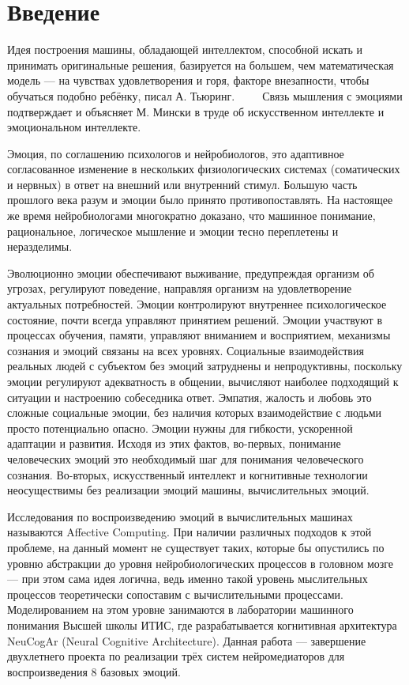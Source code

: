 \cleardoublepage
{}
{}
\chapter*{Введение}
\label{chap:introduction}
Идея построения машины, обладающей интеллектом, способной искать и принимать оригинальные решения, базируется на большем, чем математическая модель — на чувствах удовлетворения и горя, факторе внезапности, чтобы обучаться подобно ребёнку, писал А. Тьюринг.~\cite{small} ~\autocite{big} ~\autocite{intelligent_machinery} Связь мышления с эмоциями подтверждает и объясняет М. Мински в труде об искусственном интеллекте и эмоциональном интеллекте.~\cite{minsky2007}


Эмоция, по соглашению психологов и нейробиологов, это адаптивное согласованное изменение в нескольких физиологических системах (соматических и нервных) в ответ на внешний или внутренний стимул.\cite{plutchik2001} Большую часть прошлого века разум и эмоции было принято противопоставлять. На настоящее же время нейробиологами многократно доказано, что машинное понимание, рациональное, логическое мышление и эмоции тесно переплетены и неразделимы.\cite{Brosch, ziemke-role, damasio2004, damasio2008}


Эволюционно эмоции обеспечивают выживание, предупреждая  организм об угрозах, регулируют поведение, направляя организм на удовлетворение актуальных потребностей.\cite{whoneedsemotions} Эмоции контролируют внутреннее психологическое состояние, почти всегда управляют принятием решений.\cite{roleofemotions} Эмоции участвуют в процессах обучения, памяти, управляют вниманием и восприятием, механизмы сознания и эмоций связаны на всех уровнях.\cite{Phelps2006} Социальные взаимодействия реальных людей с субъектом без эмоций затруднены и непродуктивны, поскольку эмоции регулируют адекватность в общении, вычисляют наиболее подходящий к ситуации и настроению собеседника ответ. Эмпатия, жалость и любовь это сложные социальные эмоции, без наличия которых взаимодействие с людьми просто потенциально опасно. Эмоции нужны для гибкости, ускоренной адаптации и развития. Исходя из этих фактов, во-первых, понимание человеческих эмоций это необходимый шаг для понимания человеческого сознания. Во-вторых, искусственный интеллект и когнитивные технологии неосуществимы без реализации эмоций машины, вычислительных эмоций.\cite{affectivecomputing}


Исследования по воспроизведению эмоций в вычислительных машинах называются Affective Computing.\cite{affectivecomputingchallenges} При наличии различных подходов к этой проблеме, на данный момент не существует таких, которые бы опустились по уровню абстракции до уровня нейробиологических процессов в головном мозге — при этом сама идея логична, ведь именно такой уровень мыслительных процессов теоретически сопоставим с вычислительными процессами. Моделированием на этом уровне занимаются в лаборатории машинного понимания Высшей школы ИТИС, где разрабатывается когнитивная архитектура NeuCogAr (Neural Cognitive Architecture). Данная работа — завершение двухлетнего проекта по реализации трёх систем нейромедиаторов для воспроизведения 8 базовых эмоций.



